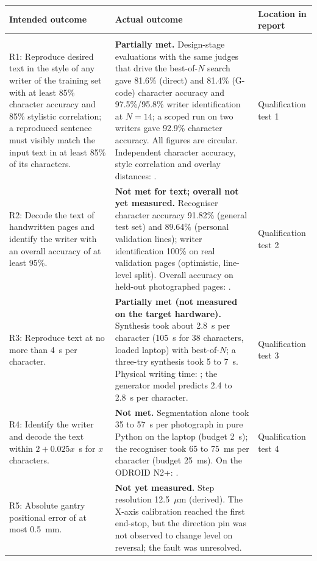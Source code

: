 \begin{table}[h]
\centering
\fontsize{10}{12}\selectfont
\begin{tabularx}{\linewidth}{|>{\raggedright\arraybackslash}p{4.6cm}|>{\raggedright\arraybackslash}X|>{\raggedright\arraybackslash}p{2.3cm}|}
\hline
\textbf{Intended outcome} & \textbf{Actual outcome} & \textbf{Location in report} \\
\hline
\multicolumn{3}{|l|}{\textbf{Core mission requirements and specifications}} \\
\hline
R1: Reproduce desired text in the style of any writer of the training set with at least 85\% character accuracy and 85\% stylistic correlation; a reproduced sentence must visibly match the input text in at least 85\% of its characters. &
\textbf{Partially met.} Design-stage evaluations with the same judges that drive the best-of-$N$ search gave 81.6\% (direct) and 81.4\% (G-code) character accuracy and 97.5\%/95.8\% writer identification at $N=14$; a scoped run on two writers gave 92.9\% character accuracy. All figures are circular. Independent character accuracy, style correlation and overlay distances: \nym{}. &
Qualification test 1 \\
\hline
R2: Decode the text of handwritten pages and identify the writer with an overall accuracy of at least 95\%. &
\textbf{Not met for text; overall not yet measured.} Recogniser character accuracy 91.82\% (general test set) and 89.64\% (personal validation lines); writer identification 100\% on real validation pages (optimistic, line-level split). Overall accuracy on held-out photographed pages: \nym{}. &
Qualification test 2 \\
\hline
R3: Reproduce text at no more than 4~s per character. &
\textbf{Partially met (not measured on the target hardware).} Synthesis took about 2.8~s per character (105~s for 38 characters, loaded laptop) with best-of-$N$; a three-try synthesis took 5 to 7~s. Physical writing time: \nym{}; the generator model predicts 2.4 to 2.8~s per character. &
Qualification test 3 \\
\hline
R4: Identify the writer and decode the text within $2+0.025x$~s for $x$ characters. &
\textbf{Not met.} Segmentation alone took 35 to 57~s per photograph in pure Python on the laptop (budget 2~s); the recogniser took 65 to 75~ms per character (budget 25~ms). On the ODROID N2+: \nym{}. &
Qualification test 4 \\
\hline
R5: Absolute gantry positional error of at most 0.5~mm. &
\textbf{Not yet measured.} Step resolution 12.5~$\mu$m (derived). The X-axis calibration reached the first end-stop, but the direction pin was not observed to change level on reversal; the fault was unresolved. &

\end{tabularx}
\end{table}
